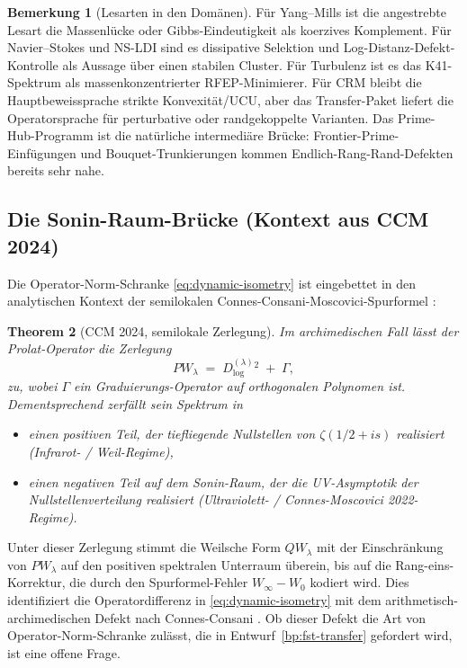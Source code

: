 \documentclass[11pt,a4paper]{article}
\theoremstyle{plain}
\newtheorem{theorem}{Theorem}[section]
\theoremstyle{definition}
\newtheorem{remark}[theorem]{Bemerkung}
\begin{document}
\begin{remark}[Lesarten in den Domänen]
\label{rem:domain-readings}
Für Yang--Mills ist die angestrebte Lesart die Massenlücke oder Gibbs-Eindeutigkeit
als koerzives Komplement. Für Navier--Stokes und NS-LDI sind es dissipative Selektion
und Log-Distanz-Defekt-Kontrolle als Aussage über einen stabilen Cluster. Für Turbulenz
ist es das K41-Spektrum als massenkonzentrierter RFEP-Minimierer. Für CRM bleibt
die Hauptbeweissprache strikte Konvexität/UCU, aber das Transfer-Paket liefert die
Operatorsprache für perturbative oder randgekoppelte Varianten. Das Prime-Hub-Programm
\cite{PrimeHubSynthesis} ist die natürliche intermediäre Brücke: Frontier-Prime-Einfügungen
und Bouquet-Trunkierungen kommen Endlich-Rang-Rand-Defekten bereits sehr nahe.
\end{remark}

\subsection{Die Sonin-Raum-Brücke (Kontext aus CCM 2024)}
\label{sec:sonin}

Die Operator-Norm-Schranke \eqref{eq:dynamic-isometry} ist eingebettet in den
analytischen Kontext der semilokalen Connes-Consani-Moscovici-Spurformel
\cite{ConnesConsaniMoscovici2024}:

\begin{theorem}[CCM 2024, semilokale Zerlegung]\label{thm:ccm-semilocal}
Im archimedischen Fall lässt der Prolat-Operator die Zerlegung
\[
  PW_\lambda \;=\; D^{(\lambda)}_{\log}{}^2 \;+\; \Gamma,
\]
zu, wobei $\Gamma$ ein Graduierungs-Operator auf orthogonalen Polynomen ist.
Dementsprechend zerfällt sein Spektrum in
\begin{itemize}[leftmargin=*]
\item einen \emph{positiven Teil}, der tiefliegende Nullstellen von
  $\zeta(1/2+is)$ realisiert (Infrarot- / Weil-Regime),
\item einen \emph{negativen Teil} auf dem Sonin-Raum, der die UV-Asymptotik
  der Nullstellenverteilung realisiert (Ultraviolett- / Connes-Moscovici 2022-Regime).
\end{itemize}
\end{theorem}

Unter dieser Zerlegung stimmt die Weilsche Form $QW_\lambda$ mit der Einschränkung
von $PW_\lambda$ auf den positiven spektralen Unterraum überein, bis auf die
Rang-eins-Korrektur, die durch den Spurformel-Fehler $W_\infty - W_0$ kodiert wird.
Dies identifiziert die Operatordifferenz in \eqref{eq:dynamic-isometry} mit dem
arithmetisch-archimedischen Defekt nach Connes-Consani \cite{ConnesConsaniWeilPositivity2020}.
Ob dieser Defekt die Art von Operator-Norm-Schranke zulässt, die in
Entwurf~\ref{bp:fst-transfer} gefordert wird, ist eine offene Frage.
\end{document}
